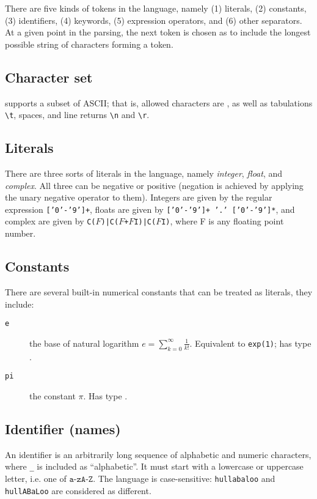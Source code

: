 There are five kinds of tokens in the language, namely
\textsf{(1)} literals, \textsf{(2)} constants, \textsf{(3)} identifiers, \textsf{(4)} keywords, \textsf{(5)} expression operators, and \textsf{(6)} other separators. At a given point in the parsing, the next token is chosen as to include the longest possible string of characters forming a token.
\subsection{Character set}
\QL supports a subset of ASCII; that is, allowed characters are
, as well as tabulations \texttt{\textbackslash{}t}, spaces, and line returns \texttt{\textbackslash{}n} and \texttt{\textbackslash{}r}.
\subsection{Literals}
There are three sorts of literals in the language, namely \emph{integer}, \emph{float}, and \emph{complex}. All three can be negative or positive (negation is achieved by applying the unary negative operator to them). Integers are given by the regular expression \texttt{['0'-'9']+}, floats are given by \texttt{['0'-'9']+ '.' ['0'-'9']*}, and complex are given by \texttt{C($F$)|C($F$+$F$I)|C($F$I)}, where F is any floating point number.
\subsection{Constants}
\noindent There are several built-in numerical constants that can be treated as literals, they include:
\begin{description}
  \item[\texttt{e}] the base of natural logarithm $e=\sum_{k=0}^\infty \frac{1}{k!}$. Equivalent to \texttt{exp(1)}; has type \complex.
\item[\texttt{pi}] the constant $\pi$. Has type \float.\\
\end{description}
\subsection{Identifier (names)}
An identifier is an arbitrarily long sequence of alphabetic and numeric characters, where \texttt{\_} is included as ``alphabetic''. It must start with a lowercase or uppercase letter, i.e. one of $\texttt{a-zA-Z}$.
\noindent The language is case-sensitive: \texttt{hullabaloo} and \texttt{hullABaLoo} are considered as different.
